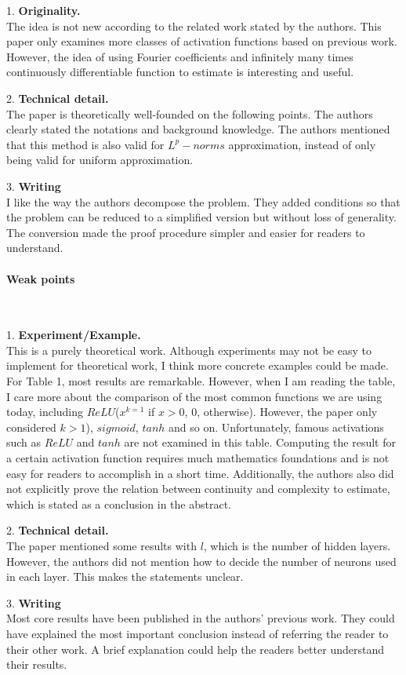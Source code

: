 \documentclass{article}
\begin{document}
1. \textbf{Originality.}  \\
The idea is not new according to the related work stated by the authors. This paper only examines more classes of activation functions based on previous work. However, the idea of using Fourier coefficients and infinitely many times continuously differentiable function to estimate is interesting and useful.

2. \textbf{Technical detail.}  \\
The paper is theoretically well-founded on the following points. The authors clearly stated the notations and background knowledge. The authors mentioned that this method is also valid for $L^p-norms$ approximation, instead of only being valid for uniform approximation. \

3. \textbf{Writing}  \\
I like the way the authors decompose the problem. They added conditions so that the problem can be reduced to a simplified version but without loss of generality. The conversion made the proof procedure simpler and easier for readers to understand. \

\paragraph{Weak points}  \ 

1. \textbf{Experiment/Example.} \\
This is a purely theoretical work. Although experiments may not be easy to implement for theoretical work, I think more concrete examples could be made. For Table 1, most results are remarkable. However, when I am reading the table, I care more about the comparison of the most common functions we are using today, including $ReLU$($x^{k=1}$ if $x > 0$, $0$, otherwise). However, the paper only considered $k>1$), $sigmoid$, $tanh$ and so on. Unfortunately, famous activations such as $ReLU$ and $tanh$ are not examined in this table. Computing the result for a certain activation function requires much mathematics foundations and is not easy for readers to accomplish in a short time. Additionally, the authors also did not explicitly prove the relation between continuity and complexity to estimate, which is stated as a conclusion in the abstract. \

2. \textbf{Technical detail.} \\
The paper mentioned some results with $l$, which is the number of hidden layers. However, the authors did not mention how to decide the number of neurons used in each layer. This makes the statements unclear. \

3. \textbf{Writing} \\
Most core results have been published in the authors' previous work. They could have explained the most important conclusion instead of referring the reader to their other work. A brief explanation could help the readers better understand their results.

\newpage



\end{document}
